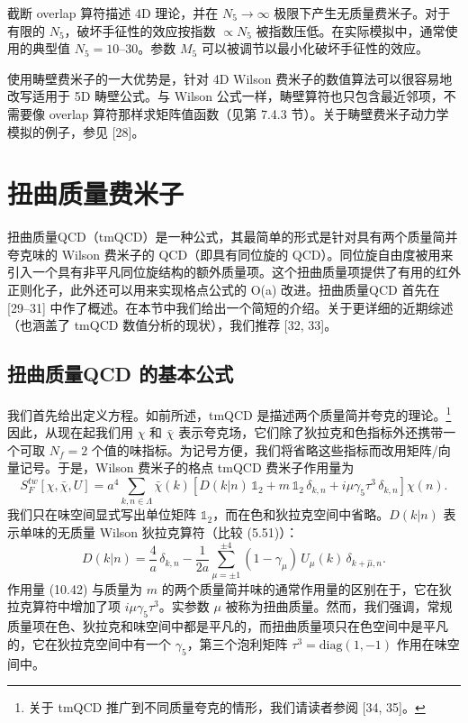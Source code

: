 截断 overlap 算符描述 4D 理论，并在 $N_5 \to \infty$ 极限下产生无质量费米子。对于有限的 $N_5$，破坏手征性的效应按指数 $\propto N_5$ 被指数压低。在实际模拟中，通常使用的典型值 $N_5 = 10$--$30$。参数 $M_5$ 可以被调节以最小化破坏手征性的效应。

使用畴壁费米子的一大优势是，针对 4D Wilson 费米子的数值算法可以很容易地改写适用于 5D 畴壁公式。与 Wilson 公式一样，畴壁算符也只包含最近邻项，不需要像 overlap 算符那样求矩阵值函数（见第 7.4.3 节）。关于畴壁费米子动力学模拟的例子，参见 [28]。

\section{扭曲质量费米子}

扭曲质量QCD（tmQCD）是一种公式，其最简单的形式是针对具有两个质量简并夸克味的 Wilson 费米子的 QCD（即具有同位旋的 QCD）。同位旋自由度被用来引入一个具有非平凡同位旋结构的额外质量项。这个扭曲质量项提供了有用的红外正则化子，此外还可以用来实现格点公式的 O(a) 改进。扭曲质量QCD 首先在 [29--31] 中作了概述。在本节中我们给出一个简短的介绍。关于更详细的近期综述（也涵盖了 tmQCD 数值分析的现状），我们推荐 [32, 33]。

\subsection{扭曲质量QCD 的基本公式}

我们首先给出定义方程。如前所述，tmQCD 是描述两个质量简并夸克的理论。\footnote{关于 tmQCD 推广到不同质量夸克的情形，我们请读者参阅 [34, 35]。}因此，从现在起我们用 $\chi$ 和 $\bar\chi$ 表示夸克场，它们除了狄拉克和色指标外还携带一个可取 $N_f = 2$ 个值的味指标。为记号方便，我们将省略这些指标而改用矩阵/向量记号。于是，Wilson 费米子的格点 tmQCD 费米子作用量为
\begin{equation}
  S_F^{tw}[\chi, \bar\chi, U] = a^4 \sum_{k,n\in\Lambda}
  \bar\chi(k)\left[D(k|n)\,\mathbb{1}_2 + m\,\mathbb{1}_2\,\delta_{k,n}
  + i\mu\gamma_5\tau^3\,\delta_{k,n}\right]\chi(n) .
\end{equation}
我们只在味空间显式写出单位矩阵 $\mathbb{1}_2$，而在色和狄拉克空间中省略。$D(k|n)$ 表示单味的无质量 Wilson 狄拉克算符（比较 (5.51)）：
\begin{equation}
  D(k|n) = \frac{4}{a}\,\delta_{k,n} -
  \frac{1}{2a}\sum_{\mu=\pm1}^{\pm4}
  (1 - \gamma_\mu)\, U_\mu(k)\, \delta_{k+\hat\mu,n} .
\end{equation}
作用量 (10.42) 与质量为 $m$ 的两个质量简并味的通常作用量的区别在于，它在狄拉克算符中增加了项 $i\mu\gamma_5\tau^3$。实参数 $\mu$ 被称为扭曲质量。然而，我们强调，常规质量项在色、狄拉克和味空间中都是平凡的，而扭曲质量项只在色空间中是平凡的，它在狄拉克空间中有一个 $\gamma_5$，第三个泡利矩阵 $\tau^3 = \mathrm{diag}(1,-1)$ 作用在味空间中。


